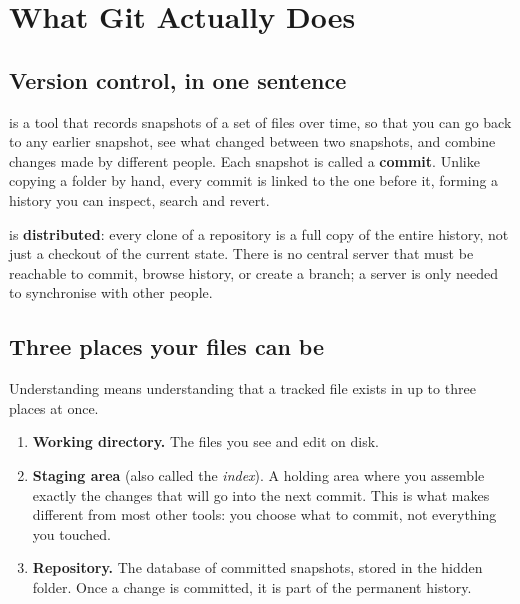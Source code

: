 \chapter{What Git Actually Does}
\label{ch:basics}


\section{Version control, in one sentence}

\Git{} is a tool that records snapshots of a set of files over time, so
that you can go back to any earlier snapshot, see what changed between
two snapshots, and combine changes made by different people. Each
snapshot is called a \textbf{commit}. Unlike copying a folder by hand,
every commit is linked to the one before it, forming a history you can
inspect, search and revert.

\Git{} is \textbf{distributed}: every clone of a repository is a full
copy of the entire history, not just a checkout of the current state.
There is no central server that must be reachable to commit, browse
history, or create a branch; a server is only needed to synchronise with
other people.

\section{Three places your files can be}

Understanding \Git{} means understanding that a tracked file exists in
up to three places at once.

\begin{enumerate}
  \item \textbf{Working directory.} The files you see and edit on disk.
  \item \textbf{Staging area} (also called the \emph{index}). A
        holding area where you assemble exactly the changes that will
        go into the next commit. This is what makes \Git{} different
        from most other tools: you choose what to commit, not
        everything you touched.
  \item \textbf{Repository.} The database of committed snapshots,
        stored in the hidden  folder. Once a change is
        committed, it is part of the permanent history.
\end{enumerate}

